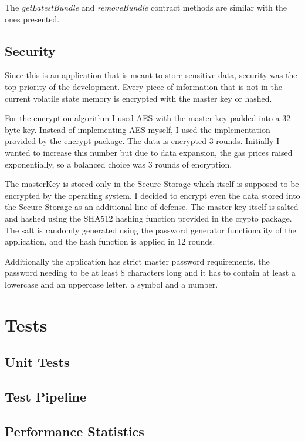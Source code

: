 \documentclass[a4paper,12pt]{report}
\begin{document}
The \textit{getLatestBundle} and \textit{removeBundle} contract methods are
similar with the ones presented.

\section{Security}

Since this is an application that is meant to store sensitive data, security
was the top priority of the development. Every piece of information that is not
in the current volatile state memory is encrypted with the master key or
hashed.

For the encryption algorithm I used AES with the master key padded into a 32
byte key. Instead of implementing AES myself, I used the implementation
provided by the encrypt package\cite{encryptDocs}. The data is encrypted 3
rounds. Initially I wanted to increase this number but due to data expansion,
the gas prices raised exponentially, so a balanced choice was 3 rounds of
encryption.

The masterKey is stored only in the Secure Storage which itself is supposed to
be encrypted by the operating system. I decided to encrypt even the data stored
into the Secure Storage as an additional line of defense. The master key itself
is salted and hashed using the SHA512 hashing function provided in the crypto
package\cite{cryptoDocs}. The salt is randomly generated using the password
generator functionality of the application, and the hash function is applied in
12 rounds.

Additionally the application has strict master password requirements, the
password needing to be at least 8 characters long and it has to contain at
least a lowercase and an uppercase letter, a symbol and a number.

\chapter{Tests}

\section{Unit Tests}

\section{Test Pipeline}

\section{Performance Statistics}
\end{document}
